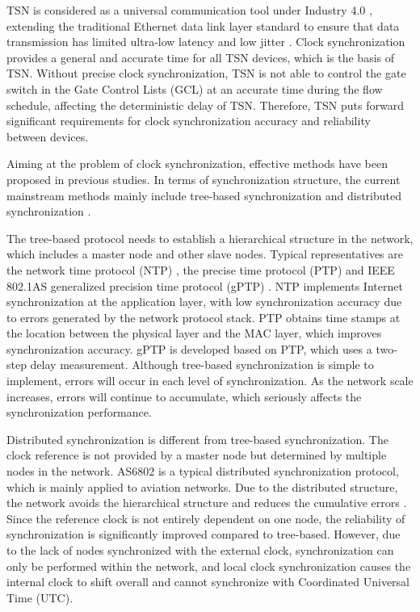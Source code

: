 \documentclass[conference]{IEEEtran}
\begin{document}
TSN is considered as a universal communication tool under Industry 4.0 \cite{ref23}, extending the traditional Ethernet data link layer standard to ensure that data transmission has limited ultra-low latency and low jitter \cite{ref22}. Clock synchronization provides a general and accurate time for all TSN devices, which is the basis of TSN. Without precise clock synchronization, TSN is not able to control the gate switch in the Gate Control Lists (GCL) at an accurate time during the flow schedule, affecting the deterministic delay of TSN. Therefore, TSN puts forward significant requirements for clock synchronization accuracy and reliability between devices.

Aiming at the problem of clock synchronization, effective methods have been proposed in previous studies. In terms of synchronization structure, the current mainstream methods mainly include tree-based synchronization and distributed synchronization \cite{ref24}. 

The tree-based protocol needs to establish a hierarchical structure in the network, which includes a master node and other slave nodes. Typical representatives are the network time protocol (NTP) \cite{ref25}, the precise time protocol (PTP) \cite{ref2} and IEEE 802.1AS generalized precision time protocol (gPTP) \cite{ref28}. NTP implements Internet synchronization at the application layer, with low synchronization accuracy due to errors generated by the network protocol stack. PTP obtains time stamps at the location between the physical layer and the MAC layer, which improves synchronization accuracy. gPTP is developed based on PTP, which uses a two-step delay measurement. Although tree-based synchronization is simple to implement, errors will occur in each level of synchronization. As the network scale increases, errors will continue to accumulate, which seriously affects the synchronization performance.

Distributed synchronization is different from tree-based synchronization. The clock reference is not provided by a master node but determined by multiple nodes in the network. AS6802 \cite{ref3} is a typical distributed synchronization protocol, which is mainly applied to aviation networks. Due to the distributed structure, the network avoids the hierarchical structure and reduces the cumulative errors \cite{ref24}. Since the reference clock is not entirely dependent on one node, the reliability of synchronization is significantly improved compared to tree-based. However, due to the lack of nodes synchronized with the external clock, synchronization can only be performed within the network, and local clock synchronization causes the internal clock to shift overall and cannot synchronize with Coordinated Universal Time (UTC).
\end{document}
